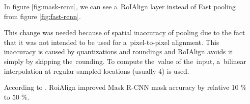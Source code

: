 In figure \ref{fig:mask-rcnn}, we can see a~RoIAlign layer instead of Fast 
  pooling from figure \ref{fig:fast-rcnn}.

This change was needed because of spatial inaccuracy of  pooling due to 
the fact that it was not intended to be used for a~pixel-to-pixel alignment. 
This inaccuracy is caused by quantizations and roundings and RoIAlign avoids it 
simply by skipping the~rounding. To compute the~value of the~input, a~bilinear 
interpolation at regular sampled locations (usually 4) is used.

According to \cite{mask-rcnn}, RoiAlign improved Mask R-CNN mask accuracy by 
relative 10 \% to 50 \%.

